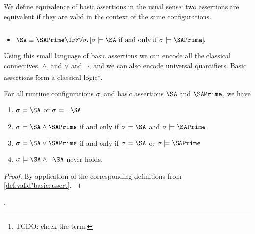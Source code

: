 We define equivalence of basic assertions in the usual sense: two assertions are equivalent if they are valid in 
the context of the same configurations.

\begin{definition} 
$ ~ $ 

\begin{itemize}
\item
$\SA \equiv \SAPrime  \IFF    \forall \sigma.\, [\sigma \models \SA \mbox{ if and only if } \sigma \models \SAPrime].$
\end{itemize}
\end{definition}

Using this small language of basic assertions we can encode all the classical connectives, \ie $\wedge$, and $\vee$ and $\neg$, and we can also encode universal quantifiers. Basic assertions form a classical logic\footnote{TODO: check the term;}.

\begin{lemma}
For all runtime configurations $\sigma$, and basic assertions $\SA$ and $\SAPrime$, we have
\begin{enumerate}
\item 
$\sigma \models \SA$ or $\sigma \models \neg\SA$
\item
$\sigma \models \SA \wedge \SAPrime$ \SP if and only if \SP $\sigma \models \SA$ and  $\sigma \models \SAPrime$ 
\item
$\sigma \models \SA \vee \SAPrime$ \SP if and only if \SP $\sigma \models \SA$ or  $\sigma \models \SAPrime$ 
\item
$\sigma \models \SA \wedge \neg\SA$ never holds.
\end{enumerate}
\end{lemma}
\begin{proof} By application of the corresponding definitions from \ref{def:valid"basic:assert}.\end{proof}.

